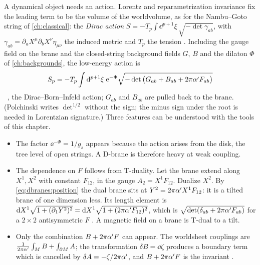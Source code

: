 A dynamical object needs an action. Lorentz and reparametrization invariance fix the leading
term to be the volume of the worldvolume, as for the Nambu--Goto string of \cref{ch:classical}:
the \emph{Dirac action} $S=-T_p\int\dd^{p+1}\xi\,\sqrt{-\det\gamma_{ab}}$, with
$\gamma_{ab}=\partial_aX^\mu\partial_bX^\nu\eta_{\mu\nu}$ the induced metric and $T_p$ the tension
. Including the gauge field on the brane and the
closed-string background fields $G$, $B$ and the dilaton $\Phi$ of \cref{ch:backgrounds}, the
low-energy action is
\begin{equation}\label{eq:dbranes:DBI}
 S_p=-T_p\int\mathrm{d}^{p+1}\xi\;\mathrm{e}^{-\Phi}\sqrt{-\det\big(G_{ab}+B_{ab}+2\pi\alpha' F_{ab}\big)}
\end{equation}
\TL\ , the Dirac--Born--Infeld
action; $G_{ab}$ and $B_{ab}$ are pulled back to the brane. (Polchinski
writes $\det^{1/2}$ without the sign; the minus sign under the root is needed in Lorentzian
signature.) Three features can be understood with the tools of this chapter.
\begin{itemize}[leftmargin=*]
\item The factor $\ee^{-\Phi}=1/g_s$ appears because the action arises from the disk, the
 tree level of open strings. A D-brane is therefore heavy at weak coupling.
\item The dependence on $F$ follows from T-duality. Let the brane extend along $X^1,X^2$ with
 constant $F_{12}$, in the gauge $A_2=X^1F_{12}$. Dualize $X^2$. By
 \eqref{eq:dbranes:position} the dual brane sits at $Y^2=2\pi\alpha' X^1F_{12}$: it is a tilted
 brane of one dimension less. Its length element is
 $\mathrm{d} X^1\sqrt{1+(\partial_1Y^2)^2}=\mathrm{d} X^1\sqrt{1+(2\pi\alpha' F_{12})^2}$, which is
 $\sqrt{\det(\delta_{ab}+2\pi\alpha' F_{ab})}$ for a $2\times2$ antisymmetric $F$ . A magnetic field on a brane is T-dual to a tilt.
\item Only the combination $B+2\pi\alpha' F$ can appear. The worldsheet couplings are
 $\frac1{2\pi\alpha'}\int_MB+\int_{\partial M}A$; the transformation $\delta B=\dd\zeta$ produces a
 boundary term which is cancelled by $\delta A=-\zeta/2\pi\alpha'$, and $B+2\pi\alpha' F$ is the
 invariant .
\end{itemize}

